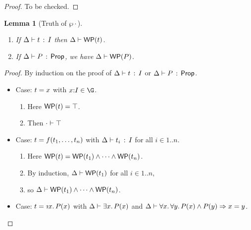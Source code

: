\documentclass[10pt,letter]{article}
\newtheorem{lemma}[theorem]{Lemma}
\begin{document}
\begin{proof}
To be checked.
\end{proof}

\clearpage

\begin{lemma}[Truth of $\wp{\cdot}$]
\mbox{}
  \begin{enumerate}
  \item If $\Delta \vdash t\, :\, I$ then
    $\Delta \vdash \mathop{\mathsf{WP}}(t)$.
  \item If $\Delta \vdash P\, :\, \mathsf{Prop}$, we have
    $\Delta \vdash \mathop{\mathsf{WP}}(P)$.
  \end{enumerate}
\end{lemma}

\begin{proof}
  \raggedright By induction on the proof of
  $\Delta \vdash t\, :\, I$ or $\Delta \vdash P\, :\, \mathsf{Prop}$.
  \begin{itemize}
  \item Case: $t = x$ with $\x{:}\I\in\G$.  
    \begin{enumerate}
      \item
        Here $\mathop{\mathsf{WP}}(t) = \top$.
      \item
        Then $\cdot \vdash \top$ 
      \end{enumerate}
  \item Case: $t = f({t}_1,\ldots,{t}_{n})$ with
    $\Delta \vdash t_i\, :\, I$ for all $i\in1..n$.
    \begin{enumerate}
    \item
      Here $\mathop{\mathsf{WP}}(t) =
      \mathop{\mathsf{WP}}(t_1) \wedge \cdots \wedge \mathop{\mathsf{WP}}(t_n)$.
    \item 
    	By induction,
      $\Delta \vdash \mathop{\mathsf{WP}}(t_1)$ for
      all $i\in1..n$, 
    \item 
    	so
    $\Delta \vdash \mathop{\mathsf{WP}}(t_1) \wedge \cdots \wedge \mathop{\mathsf{WP}}(t_n)$.
    \end{enumerate}
    
  \item Case: $\t = \tDesc{\x}{\I}{\p(\x)}$ with
  $\Delta \vdash \exists x.\, P(x)$ and 
  $\Delta \vdash \forall x.\, \forall y.\, P(x) \wedge P(y) \Rightarrow x=y$.


\end{itemize}
\end{proof}
\end{document}
